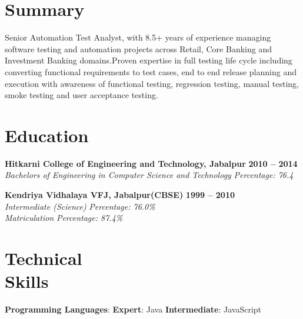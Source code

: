 \documentclass[margin,line]{resume}
\begin{document}
  \address{mobile: +91-9930145225 \\ email: yadavpriyta@gmail.com}
\begin{resume}

    \section{\mysidestyle Summary}
    Senior Automation Test Analyst, with 8.5+ years of experience managing software testing and automation projects across Retail, Core Banking and Investment Banking domains.Proven expertise in full testing life cycle including converting functional requirements to test cases, end to end release planning and execution with awareness of functional testing, regression testing, manual testing, smoke testing and user acceptance testing.   
    \section{\mysidestyle Education}

    \textbf{Hitkarni College of Engineering and Technology, Jabalpur} \hfill \textbf{2010 -- 2014}\vspace{0mm}\\\vspace{0mm}%
    \textsl{Bachelors of Engineering in Computer Science and Technology} \hfill \textsl{Percentage: 76.4}
    
    \textbf{Kendriya Vidhalaya VFJ, Jabalpur(CBSE)} \hfill \textbf{1999 -- 2010}\vspace{0mm}\\\vspace{0mm}%
    \textsl{Intermediate (Science)} \hfill \textsl{Percentage: 76.0\%}\vspace{0mm}\\\vspace{0mm}%
    \textsl{Matriculation } \hfill \textsl{Percentage: 87.4\%}
    \section{\mysidestyle Technical \\ Skills}
    \vspace{0mm}
     \textbf{Programming Languages}: \textbf{Expert}: Java \textbf{Intermediate}: JavaScript
     

\end{resume}
\end{document}
